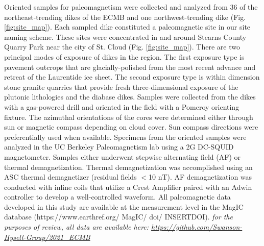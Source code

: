 \documentclass[draft]{agujournal2019}
\begin{document}
Oriented samples for paleomagnetism were collected and analyzed from 36 of the northeast-trending dikes of the ECMB and one northwest-trending dike (Fig. \ref{fig:site_map}). Each sampled dike constituted a paleomagnetic site in our site naming scheme. These sites were concentrated in and around Stearns County Quarry Park near the city of St. Cloud (Fig. \ref{fig:site_map}). There are two principal modes of exposure of dikes in the region. The first exposure type is pavement outcrops that are glacially-polished from the most recent advance and retreat of the Laurentide ice sheet. The second exposure type is within dimension stone granite quarries that provide fresh three-dimensional exposure of the plutonic lithologies and the diabase dikes. Samples were collected from the dikes with a gas-powered drill and oriented in the field with a Pomeroy orienting fixture. The azimuthal orientations of the cores were determined either through sun or magnetic compass depending on cloud cover. Sun compass directions were preferentially used when available. Specimens from the oriented samples were analyzed in the UC Berkeley Paleomagnetism lab using a 2G DC-SQUID magnetometer. Samples either underwent stepwise alternating field (AF) or thermal demagnetization. Thermal demagnetization was accomplished using an ASC thermal demagnetizer (residual fields $<$10 nT). AF demagnetization was conducted with inline coils that utilize a Crest Amplifier paired with an Adwin controller to develop a well-controlled waveform. All paleomagnetic data developed in this study are available at the measurement level in the MagIC database (https://www.earthref.org/ MagIC/ doi/ INSERTDOI). \textit{for the purposes of review, all data are available here: \url{https://github.com/Swanson-Hysell-Group/2021_ECMB}}
\end{document}
